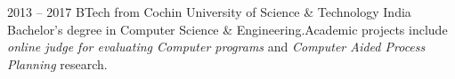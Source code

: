 \documentclass[9pt]{developercv} %
\begin{document}


\begin{entrylist}
	\entry
		{2013 -- 2017}
		{BTech}
		{from}
		{Cochin University of Science \& Technology}
		{India}
		{Bachelor's degree in Computer Science \& Engineering.Academic projects include \emph{online judge for evaluating Computer programs} and \emph{Computer Aided Process Planning} research.}
	
\end{entrylist}

\smallskip\\


\end{document}
